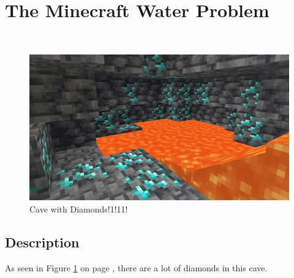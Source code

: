 \section{The Minecraft Water Problem}

\begin{center}
 \ \cite{deepmcquotes}

\begin{figure}[h]
    \centering
    \includegraphics[width=0.5\linewidth]{images/diamonds.png}
    \caption{Cave with Diamonds!1!11! \cite{knuthwebsite}}
    \label{fig:cave-diamonds}
\end{figure}
\end{center}

\subsection{Description}

As seen in Figure \ref{fig:cave-diamonds} on page \pageref{fig:cave-diamonds}, there are a lot of diamonds in this cave.